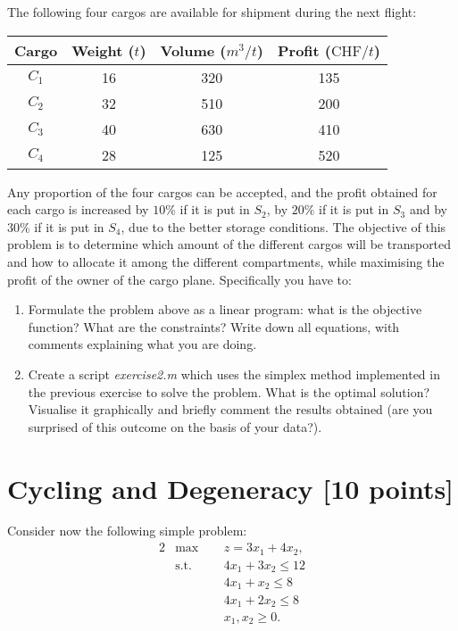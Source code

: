 \documentclass[unicode,11pt,a4paper,oneside,numbers=endperiod,openany]{scrartcl}
\begin{document}
The following four cargos are available for shipment during the next flight:

\begin{center}
 \begin{tabular}{|| c | c | c | c ||} 
 \hline
 Cargo & Weight ($t$) & Volume ($m^3/t$) & Profit ($\text{CHF}/t$) \\ [0.5ex] 
 \hline\hline
 $C_1$ & 16  & 320 & 135 \\ 
 \hline
 $C_2$ & 32  & 510 & 200 \\
 \hline
 $C_3$ & 40 & 630 & 410 \\
 \hline
 $C_4$ & 28 & 125 & 520 \\
 \hline
\end{tabular}
\end{center}

Any proportion of the four cargos can be accepted, and the profit obtained for each cargo is increased by $10\%$ if it is put in $S_2$, by $20\%$ if it is put in $S_3$ and by $30\%$ if it is put in $S_4$, due to the better storage conditions. The objective of this problem is to determine which amount of the different cargos will be transported and how to allocate it among the different compartments, while maximising the profit of the owner of the cargo plane. Specifically you have to:
\begin{enumerate}
	\item Formulate the problem above as a linear program: what is the objective function? What are the constraints? Write down all equations, with comments explaining what you are doing.
	\item Create a script \emph{exercise2.m} which uses the simplex method implemented in the previous exercise to solve the problem. What is the optimal solution? Visualise it graphically and briefly comment the results obtained (are you surprised of this outcome on the basis of your data?).
\end{enumerate}


\section{Cycling and Degeneracy [10 points]}

Consider now the following simple problem:
\begin{alignat*}{2}
	&\text{max}\;\, && z = 3x_1+4x_2,\\
	&\text{s.t.} && 4x_1+3x_2\leq 12\\
	& && 4x_1+x_2\leq 8\\
	& && 4x_1+2x_2\leq 8\\
	& && x_1, x_2 \geq 0.
\end{alignat*}
\end{document}
